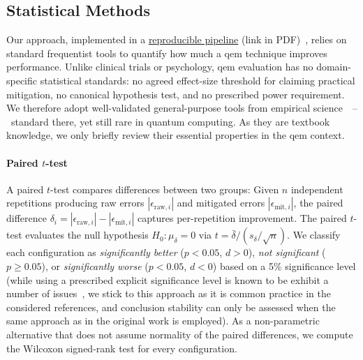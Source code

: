 \documentclass[10pt,conference]{IEEEtran}
\begin{document}
\subsection{Statistical Methods}
\label{sec:bg-stats}
Our approach, implemented in a \href{https://github.com/lfd/qce26_claim_against_measurement}{reproducible pipeline} (link in PDF)~\cite{mauerer_repro_2022}, relies on standard frequentist tools to quantify how much a \gls{qem} technique improves performance. Unlike clinical trials or psychology, \gls{qem} evaluation has no domain-specific statistical standards: no agreed effect-size threshold for claiming practical mitigation, no canonical hypothesis test, and no prescribed power requirement. We therefore adopt well-validated general-purpose tools from empirical science~\cite{cohen_statistical_1988, fahrmeir_statistik_2023, devore2008probability}~--~standard there, yet still rare in quantum computing. As they are textbook knowledge, we only briefly review their essential properties in the \gls{qem} context.

\paragraph{Paired $t$-test}
A paired $t$-test compares differences between two groups: Given $n$ independent repetitions producing raw errors $|\epsilon_{\text{raw},i}|$ and mitigated errors $|\epsilon_{\text{mit},i}|$, the paired difference $\delta_i = |\epsilon_{\text{raw},i}| - |\epsilon_{\text{mit},i}|$ captures per-repetition improvement.
The paired $t$-test evaluates the null hypothesis $H_0\!: \mu_\delta = 0$ via $t = \bar{\delta} / (s_\delta / \sqrt{n})$. We classify each configuration as \emph{significantly better} ($p < 0.05$, $d > 0$), \emph{not significant} ($p \geq 0.05$), or \emph{significantly worse} ($p < 0.05$, $d < 0$) based on a 5\% significance level (while using a prescribed explicit significance level is known to be exhibit a number of issues~\cite{wasserstein2016asa}, we stick to this approach as it is common practice in the considered references, and conclusion stability can only be assessed when the same approach as in the original work is employed). As a non-parametric alternative that does not assume normality of the paired differences, we compute the Wilcoxon signed-rank test for every configuration.
\end{document}

